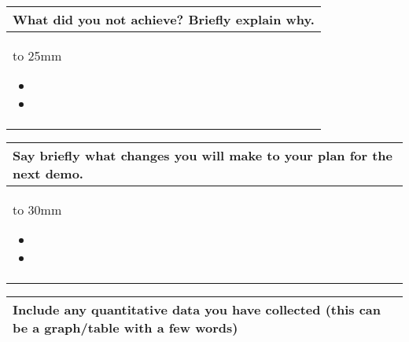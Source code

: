 \documentclass[a4paper]{article}
\newcommand{\colWidth}{141mm}
\begin{document}
\begin{center}

\begin{tabular}{|p{\colWidth}|}
	\hline
	\cellcolor{blue!25}\large
	\textbf{What did you not achieve? Briefly explain why.}
	\\ \hline
	\vtop to 25mm{
	\begin{itemize}
	    \item 
	    \item 
	\end{itemize}
  }
  \\
  \hline
\end{tabular}
\vskip 5mm


\begin{tabular}{|p{\colWidth}|}
	\hline
	\cellcolor{blue!25}\large
	\textbf{Say briefly what changes you will make to your plan for the next demo.}
	\\ \hline
	\vtop to 30mm{
	\begin{itemize}
	    \item 
	    \item 
	\end{itemize}
  }
  \\
  \hline
\end{tabular}

\newpage
\begin{tabular}{|p{\colWidth}|}
	\hline
	\cellcolor{blue!25}\large
	\textbf{Include any quantitative data you have collected (this can be a graph/table with a few words)}
  \\
  \hline
\end{tabular}
\end{center}
  
\end{document}
